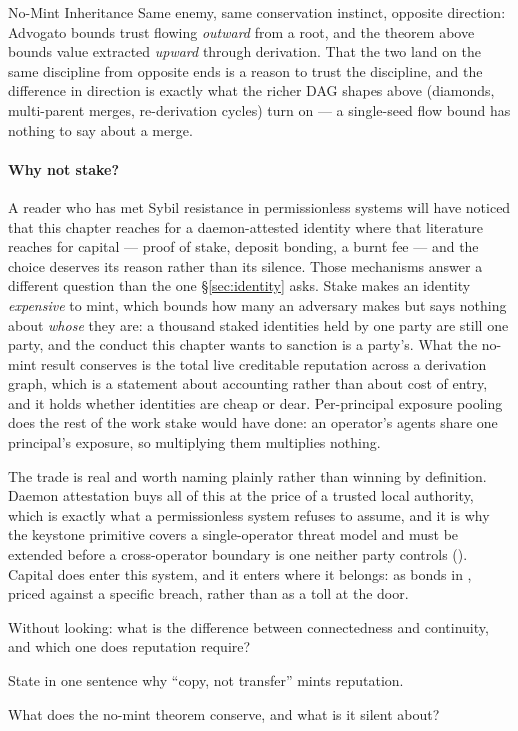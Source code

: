 \documentclass[11pt,a4paper]{article}
\theoremstyle{definition}
\begin{document}
\begin{pdexample}{No-Mint Inheritance}
Same enemy, same
conservation instinct, opposite direction: Advogato bounds trust flowing
\emph{outward} from a root, and the theorem above bounds value extracted
\emph{upward} through derivation. That the two land on the same discipline
from opposite ends is a reason to trust the discipline, and the difference in
direction is exactly what the richer DAG shapes above (diamonds, multi-parent
merges, re-derivation cycles) turn on --- a single-seed flow bound has nothing
to say about a merge.
\end{pdexample}

\paragraph{Why not stake?} A reader who has met Sybil resistance in
permissionless systems will have noticed that this chapter reaches for a
daemon-attested identity where that literature reaches for capital --- proof of
stake, deposit bonding, a burnt fee --- and the choice deserves its reason
rather than its silence. Those mechanisms answer a different question than the
one \S\ref{sec:identity} asks. Stake makes an identity \emph{expensive} to mint,
which bounds how many an adversary makes but says nothing about \emph{whose}
they are: a thousand staked identities held by one party are still one party,
and the conduct this chapter wants to sanction is a party's. What the
no-mint result conserves is the total live creditable reputation across a
derivation graph, which is a statement about accounting rather than about cost
of entry, and it holds whether identities are cheap or dear. Per-principal
exposure pooling does the rest of the work stake would have done: an operator's
agents share one principal's exposure, so multiplying them multiplies nothing.

The trade is real and worth naming plainly rather than winning by definition.
Daemon attestation buys all of this at the price of a trusted local authority,
which is exactly what a permissionless system refuses to assume, and it is why
the keystone primitive covers a single-operator threat model and must be
extended before a cross-operator boundary is one neither party controls
(). Capital does enter this system, and it
enters where it belongs: as bonds in ,
priced against a specific breach, rather than as a toll at the door.
\pdexercisepointerone*{\ref{ex:stp-nomint-sweep}}{\pageref{ex:stp-nomint-sweep}}

\begin{pdrecitation}
\item Without looking: what is the difference between connectedness and
continuity, and which one does reputation require?
\item State in one sentence why ``copy, not transfer'' mints reputation.
\item What does the no-mint theorem conserve, and what is it silent about?
\end{pdrecitation}
\end{document}
